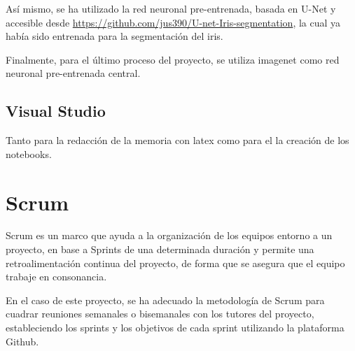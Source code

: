 Así mismo, se ha utilizado la red neuronal pre-entrenada, basada en U-Net y accesible desde \url{https://github.com/jus390/U-net-Iris-segmentation}, la cual ya había sido
entrenada para la segmentación del iris.

Finalmente, para el último proceso del proyecto, se utiliza imagenet como red neuronal pre-entrenada central.

\subsection{Visual Studio}

Tanto para la redacción de la memoria con latex como para el la creación de los notebooks.

\section{Scrum}
Scrum es un marco que ayuda a la organización de los equipos entorno a un proyecto, en base a Sprints de una determinada duración y permite una retroalimentación
continua del proyecto, de forma que se asegura que el equipo trabaje en consonancia.

En el caso de este proyecto, se ha adecuado la metodología de Scrum para cuadrar reuniones semanales o bisemanales con los tutores del proyecto, estableciendo
los sprints y los objetivos de cada sprint utilizando la plataforma Github.





